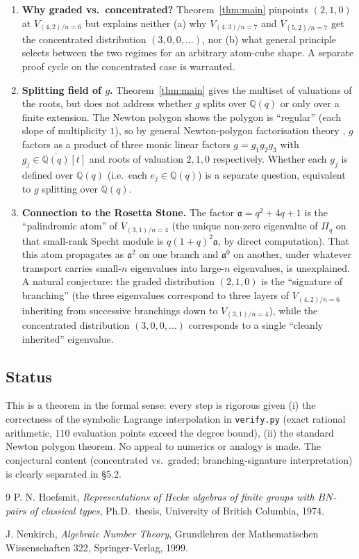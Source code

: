 \documentclass[11pt]{article}
\theoremstyle{plain}
\theoremstyle{definition}
\theoremstyle{remark}
\newcommand{\Q}{\mathbb{Q}}
\newcommand{\Pibs}{\Pi_q}
\newcommand{\atom}{\mathfrak{a}}
\begin{document}
\begin{enumerate}
\item \textbf{Why graded vs.\ concentrated?} Theorem~\ref{thm:main} pinpoints $(2,1,0)$
at $V_{(4,2)/n=6}$ but explains neither (a) why $V_{(4,3)/n=7}$ and $V_{(5,2)/n=7}$
get the concentrated distribution $(3,0,0,\ldots)$, nor (b) what general principle
selects between the two regimes for an arbitrary atom-cube shape.  A separate proof
cycle on the concentrated case is warranted.

\item \textbf{Splitting field of $g$.} Theorem~\ref{thm:main} gives the multiset
of valuations of the roots, but does not address whether $g$ splits over $\Q(q)$
or only over a finite extension.  The Newton polygon shows the polygon is
``regular'' (each slope of multiplicity $1$), so by general Newton-polygon
factorisation theory \cite[Ch.~II,~Cor.~6.5]{Neukirch}, $g$ factors as a product
of three monic linear factors $g = g_1 g_2 g_3$ with $g_j \in \overline{\Q(q)}[t]$
and roots of valuation $2, 1, 0$ respectively.  Whether each $g_j$ is defined over
$\Q(q)$ (i.e.\ each $e_j \in \Q(q)$) is a separate question, equivalent to
$g$ splitting over $\Q(q)$.

\item \textbf{Connection to the Rosetta Stone.} The factor $\atom = q^2 + 4q + 1$
is the ``palindromic atom'' of $V_{(3,1)/n=4}$ (the unique non-zero eigenvalue of
$\Pibs$ on that small-rank Specht module is $q(1+q)^2 \atom$, by direct computation).
That this atom propagates as $\atom^2$ on one branch and $\atom^0$ on another,
under whatever transport carries small-$n$ eigenvalues into large-$n$ eigenvalues,
is unexplained.  A natural conjecture: the graded distribution $(2,1,0)$ is the
``signature of branching'' (the three eigenvalues correspond to three layers of
$V_{(4,2)/n=6}$ inheriting from successive branchings down to $V_{(3,1)/n=4}$),
while the concentrated distribution $(3,0,0,\ldots)$ corresponds to a single
``cleanly inherited'' eigenvalue.
\end{enumerate}

\subsection{Status}

This is a theorem in the formal sense: every step is rigorous given (i) the
correctness of the symbolic Lagrange interpolation in
\texttt{verify.py} (exact rational arithmetic, $110$ evaluation points exceed the
degree bound), (ii) the standard Newton polygon theorem.  No appeal to numerics or
analogy is made.  The conjectural content (concentrated vs.\ graded;
branching-signature interpretation) is clearly separated in \S 5.2.

\begin{thebibliography}{9}
 P. N. Hoefsmit, \emph{Representations of Hecke algebras of
finite groups with $BN$-pairs of classical types}, Ph.D.\ thesis, University of
British Columbia, 1974.

 J. Neukirch, \emph{Algebraic Number Theory}, Grundlehren der
Mathematischen Wissenschaften 322, Springer-Verlag, 1999.
\end{thebibliography}
\end{document}
